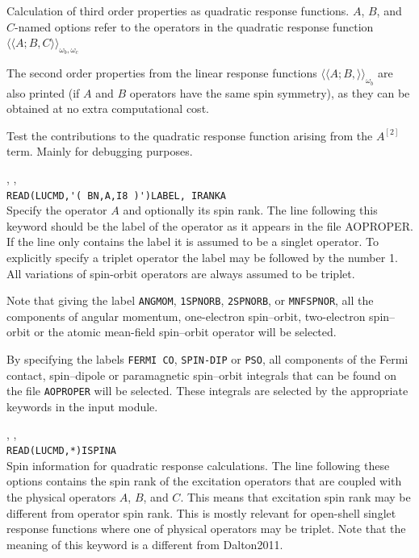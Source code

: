 Calculation of third order properties
 as quadratic response
functions.
$A$, $B$, and $C$-named options refer to the operators in the quadratic
response function
$\langle\!\langle A;B,C \rangle\!\rangle_{\omega_b,\omega_c}$
\cite{ovhapjhjajthjojcp97,hhhjajpjjojcp97,haovhkpjthjcp98}

The second order properties from the linear response functions
$\langle\!\langle A;B,\rangle\!\rangle_{\omega_b}$ are also printed
(if $A$ and $B$ operators have the same spin symmetry),
as they can be obtained at no extra computational cost.

\begin{description}

\item{}
Test the contributions to the quadratic response function arising from
the $A^{\left[2\right]}$ term. Mainly for debugging purposes.

\item{, , }\\
\verb|READ(LUCMD,'( BN,A,I8 )')LABEL, IRANKA|\\
Specify the operator $A$ and optionally its spin rank. The line following this
keyword should be the label of the operator as it appears in the file
AOPROPER. If the line only contains the label it is assumed to be a singlet
operator. To explicitly specify a triplet operator the label may be followed by the number 1. All variations of spin-orbit operators are always assumed to be triplet.

Note that giving the label \verb|ANGMOM|, \verb|1SPNORB|,
\verb|2SPNORB|, or \verb|MNFSPNOR|, all the components of angular
momentum, one-electron spin--orbit, two-electron spin--orbit or the
atomic mean-field spin--orbit operator will be selected.

By specifying the labels \verb|FERMI CO|, \verb|SPIN-DIP| or
\verb|PSO|, all components of the Fermi contact, spin--dipole or
paramagnetic spin--orbit integrals that can be found on the file
\verb|AOPROPER| will be selected. These integrals are selected by the
appropriate keywords in the  input module.

\item{, , }\\
\verb|READ(LUCMD,*)ISPINA|\\
Spin information for quadratic response calculations.
The line following these options contains the spin
rank of the excitation operators that are coupled with the
physical operators $A$, $B$, and $C$. This means that excitation spin rank may
be different from operator spin rank.
This is mostly relevant for open-shell singlet response functions
where one of physical operators may be triplet.
Note that the meaning of this keyword is a different from Dalton2011.


\end{description}
